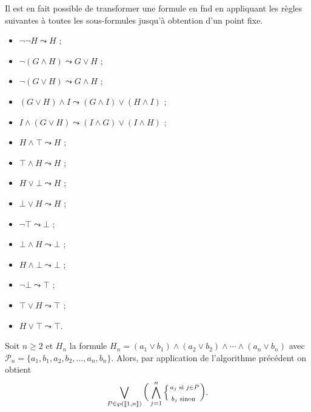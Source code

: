 \begin{rmk}
	Il est en fait possible de transformer une formule en {\sc fnd}\/ en appliquant les règles suivantes à toutes les sous-formules jusqu'à obtention d'un point fixe.
	\begin{multicols}{2}
		\begin{itemize}
			\item $\lnot \lnot H \leadsto H$\/ ;
			\item $\lnot(G \land H) \leadsto G \lor H$\/ ;
			\item $\lnot (G \lor H) \leadsto G \land H$\/ ;
			\item $(G \lor H) \land I \leadsto (G \land I) \lor (H \land I)$\/ ;
			\item $I \land (G \lor H) \leadsto (I \land G) \lor (I \land H)$\/ ;
		\end{itemize}
	\end{multicols}
	\begin{multicols}{3}
		\begin{itemize}
			\item $H \land \top \leadsto H$\/ ;
			\item $\top \land H \leadsto H$\/ ;
			\item $H \lor \bot \leadsto H$\/ ;
			\item $\bot \lor H \leadsto H$\/ ;
			\item $\lnot \top \leadsto \bot$\/ ;
			\item $\bot \land H \leadsto \bot$\/ ;
			\item $H \land \bot \leadsto \bot$\/ ;
			\item $\lnot \bot \leadsto \top$\/ ;
			\item $\top \lor H \leadsto \top$\/ ;
			\item $H \lor \top \leadsto \top$.
		\end{itemize}
	\end{multicols}
\end{rmk}

\begin{prop}
	Soit $n \ge 2$\/ et $H_n$\/ la formule $H_n = (a_1 \lor b_1) \land (a_2 \lor b_2) \land \cdots \land (a_n \lor b_n)$\/ avec $\mathcal{P}_n = \{a_1,b_1,a_2,b_2,\ldots,a_n,b_n\}$. Alors, par application de l'algorithme précédent on obtient \[
		\bigvee_{P \in \wp(\left\llbracket 1,n \right\rrbracket)}\bigg(\bigwedge_{j = 1}^n \Big\{{\scriptstyle a_j \text{ si } j \in P \atop\scriptstyle b_j \text{ sinon }}\bigg)
	.\]
\end{prop}


